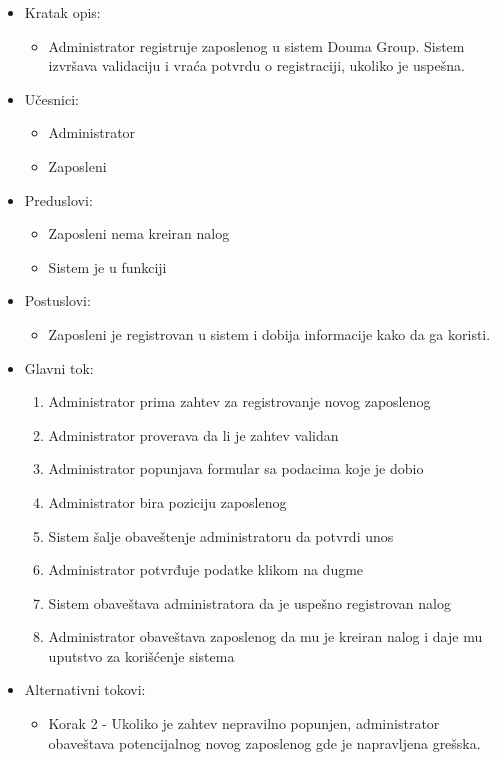 \documentclass[a4paper]{article}
\begin{document}
\begin{itemize}
    \item Kratak opis: 
    \begin{itemize}
        \item Administrator registruje zaposlenog u sistem Douma Group. Sistem izvršava validaciju i vraća potvrdu o registraciji, ukoliko je uspešna.
    \end{itemize}
    \item Učesnici:
        \begin{itemize}
        \item Administrator
        \item Zaposleni
    \end{itemize}
    \item Preduslovi:
        \begin{itemize}
            \item Zaposleni nema kreiran nalog 
            \item Sistem je u funkciji
        \end{itemize}
    \item Postuslovi:
        \begin{itemize}
            \item Zaposleni je registrovan u sistem i dobija informacije kako da ga koristi.
        \end{itemize}
    \item Glavni tok:
        \begin{enumerate}
            \item Administrator prima zahtev za registrovanje novog zaposlenog
            \item Administrator proverava da li je zahtev validan
            \item Administrator popunjava formular sa podacima koje je dobio
            \item Administrator bira poziciju zaposlenog
            \item Sistem šalje obaveštenje administratoru da potvrdi unos
            \item Administrator potvrđuje podatke klikom na dugme
            \item Sistem obaveštava administratora da je uspešno registrovan nalog
            \item Administrator obaveštava zaposlenog da mu je kreiran nalog i daje mu uputstvo za korišćenje sistema
        \end{enumerate}
    \item Alternativni tokovi:
        \begin{itemize}
            \item Korak 2 - Ukoliko je zahtev nepravilno popunjen, administrator obaveštava potencijalnog novog zaposlenog gde je napravljena grešska.
        \end{itemize}
\end{itemize}
\end{document}
